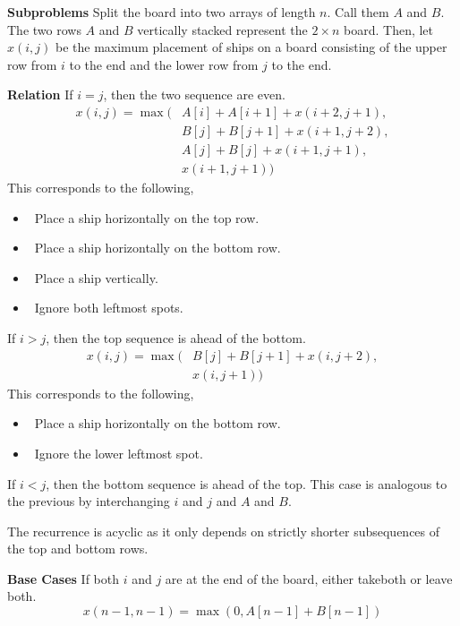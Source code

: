 \documentclass[12pt,twoside]{article}
\begin{document}
\begin{problems}
\begin{problemparts}
\end{problemparts}

\newpage
\problem  %
{\bf Subproblems} Split the board into two arrays of length $n$. Call them
$A$ and $B$. The two rows $A$ and $B$ vertically stacked represent the $2
\times n$ board. Then, let $x(i, j)$ be the maximum placement of ships on a
board consisting of the upper row from $i$ to the end and the lower row from
$j$ to the end.

{\bf Relation} If $i = j$, then the two sequence are even.
\begin{align*}
  x(i, j) = \max(&A[i] + A[i + 1] + x(i + 2, j + 1), \\
    &B[j] + B[j + 1] + x(i + 1, j + 2), \\
    &A[j] + B[j] + x(i + 1, j + 1), \\
    &x(i + 1, j + 1))
\end{align*}
This corresponds to the following,
\begin{itemize}
  \item\ Place a ship horizontally on the top row.
  \item\ Place a ship horizontally on the bottom row.
  \item\ Place a ship vertically.
  \item\ Ignore both leftmost spots.
\end{itemize}

If $i > j$, then the top sequence is ahead of the bottom.
\begin{align*}
  x(i, j) = \max(&B[j] + B[j + 1] + x(i, j + 2),\\
    &x(i, j + 1))
\end{align*}
This corresponds to the following,
\begin{itemize}
  \item\ Place a ship horizontally on the bottom row.
  \item\ Ignore the lower leftmost spot.
\end{itemize}

If $i < j$, then the bottom sequence is ahead of the top. This case is
analogous to the previous by interchanging $i$ and $j$ and $A$ and $B$.

The recurrence is acyclic as it only depends on strictly shorter subsequences
of the top and bottom rows.

{\bf Base Cases} If both $i$ and $j$ are at the end of the board, either
takeboth or leave both.
$$ x(n - 1, n - 1) = \max(0, A[n - 1] + B[n - 1]) $$


\end{problems}
\end{document}
